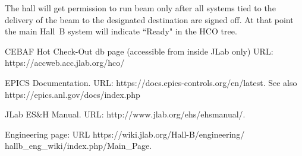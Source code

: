 \documentclass[12pt]{report}
\begin{document}
The hall will get permission to run beam only after all systems tied to the delivery of the 
beam to the designated destination are signed off. At that point the main Hall~B system will 
indicate ``Ready" in the HCO tree.























%



%











\begin{thebibliography}{99}
 CEBAF Hot Check-Out db page (accessible from inside JLab only)
URL: https://accweb.acc.jlab.org/hco/

EPICS Documentation. URL: https://docs.epics-controls.org/en/latest.
See also https://epics.anl.gov/docs/index.php

JLab ES\&H Manual. URL: http://www.jlab.org/ehs/ehsmanual/.

Engineering page: URL https://wiki.jlab.org/Hall-B/engineering/\\hallb\_eng\_wiki/index.php/Main\_Page.

\end{thebibliography}
\end{document}

